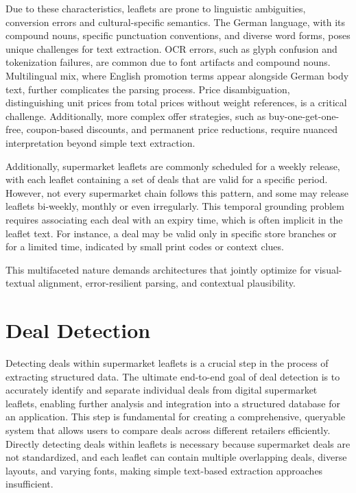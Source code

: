 \documentclass[11pt]{article}
\begin{document}
Due to these characteristics, leaflets are prone to linguistic ambiguities, conversion errors and cultural-specific semantics. The German language, with its compound nouns, specific punctuation conventions, and diverse word forms, poses unique challenges for text extraction. OCR errors, such as glyph confusion and tokenization failures, are common due to font artifacts and compound nouns. Multilingual mix, where English promotion terms appear alongside German body text, further complicates the parsing process. Price disambiguation, distinguishing unit prices from total prices without weight references, is a critical challenge. Additionally, more complex offer strategies, such as buy-one-get-one-free, coupon-based discounts, and permanent price reductions, require nuanced interpretation beyond simple text extraction.

Additionally, supermarket leaflets are commonly scheduled for a weekly release, with each leaflet containing a set of deals that are valid for a specific period. However, not every supermarket chain follows this pattern, and some may release leaflets bi-weekly, monthly or even irregularly. This temporal grounding problem requires associating each deal with an expiry time, which is often implicit in the leaflet text. For instance, a deal may be valid only in specific store branches or for a limited time, indicated by small print codes or context clues.

This multifaceted nature demands architectures that jointly optimize for visual-textual alignment, error-resilient parsing, and contextual plausibility.

\section{Deal Detection}
\label{sec:deal_detection}
Detecting deals within supermarket leaflets is a crucial step in the process of extracting structured  data. The ultimate end-to-end goal of deal detection is to accurately identify and separate individual deals from digital supermarket leaflets, enabling further analysis and integration into a structured database for an application. This step is fundamental for creating a comprehensive, queryable system that allows users to compare deals across different retailers efficiently. Directly detecting deals within leaflets is necessary because supermarket deals are not standardized, and each leaflet can contain multiple overlapping deals, diverse layouts, and varying fonts, making simple text-based extraction approaches insufficient.
\end{document}
